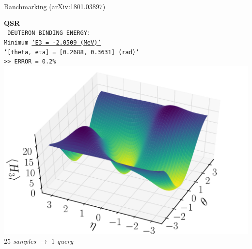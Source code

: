 \documentclass[9pt, handout, aspectratio=169]{beamer}	%
\begin{document}
\begin{frame}{Banchmarking (arXiv:1801.03897)}
\begin{multicols}{2}
		\begin{center}
			\textbf{QSR} \\
			\texttt{ \small
				DEUTERON BINDING ENERGY: \\
				Minimum \underline{'E3 = -2.0509 (MeV)'} \\
				'[theta, eta] = [0.2688, 0.3631] (rad)' \\
				>> ERROR = 0.2\% } \\
			\smallskip
			\includegraphics[width=.35\paperwidth]{Figures/deuteron-QSR} \\
			\smallskip
			\small{\emph{$25$ samples $\rightarrow$ $1$ query}}
		\end{center}

	\end{multicols}

\end{frame}

\end{document}
